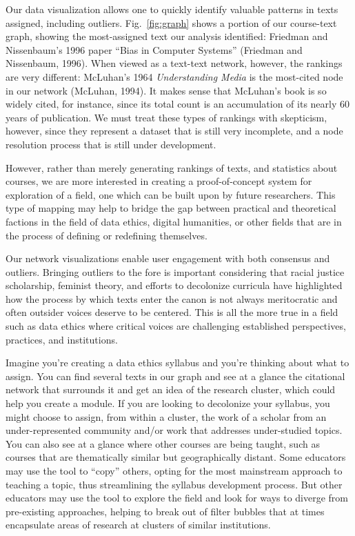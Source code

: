 \documentclass[
]{article}
\begin{document}
Our data visualization allows one to quickly identify valuable patterns
in texts assigned, including outliers. Fig.~\ref{fig:graph} shows a
portion of our course-text graph, showing the most-assigned text our
analysis identified: Friedman and Nissenbaum's 1996 paper ``Bias in
Computer Systems'' (Friedman and Nissenbaum, 1996). When viewed as a
text-text network, however, the rankings are very different: McLuhan's
1964 \emph{Understanding Media} is the most-cited node in our network
(McLuhan, 1994). It makes sense that McLuhan's book is so widely cited,
for instance, since its total count is an accumulation of its nearly 60
years of publication. We must treat these types of rankings with
skepticism, however, since they represent a dataset that is still very
incomplete, and a node resolution process that is still under
development.

However, rather than merely generating rankings of texts, and statistics
about courses, we are more interested in creating a proof-of-concept
system for exploration of a field, one which can be built upon by future
researchers. This type of mapping may help to bridge the gap between
practical and theoretical factions in the field of data ethics, digital
humanities, or other fields that are in the process of defining or
redefining themselves.

Our network visualizations enable user engagement with both consensus
and outliers. Bringing outliers to the fore is important considering
that racial justice scholarship, feminist theory, and efforts to
decolonize curricula have highlighted how the process by which texts
enter the canon is not always meritocratic and often outsider voices
deserve to be centered. This is all the more true in a field such as
data ethics where critical voices are challenging established
perspectives, practices, and institutions.

Imagine you're creating a data ethics syllabus and you're thinking about
what to assign. You can find several texts in our graph and see at a
glance the citational network that surrounds it and get an idea of the
research cluster, which could help you create a module. If you are
looking to decolonize your syllabus, you might choose to assign, from
within a cluster, the work of a scholar from an under-represented
community and/or work that addresses under-studied topics. You can also
see at a glance where other courses are being taught, such as courses
that are thematically similar but geographically distant. Some educators
may use the tool to ``copy'' others, opting for the most mainstream
approach to teaching a topic, thus streamlining the syllabus development
process. But other educators may use the tool to explore the field and
look for ways to diverge from pre-existing approaches, helping to break
out of filter bubbles that at times encapsulate areas of research at
clusters of similar institutions.
\end{document}
